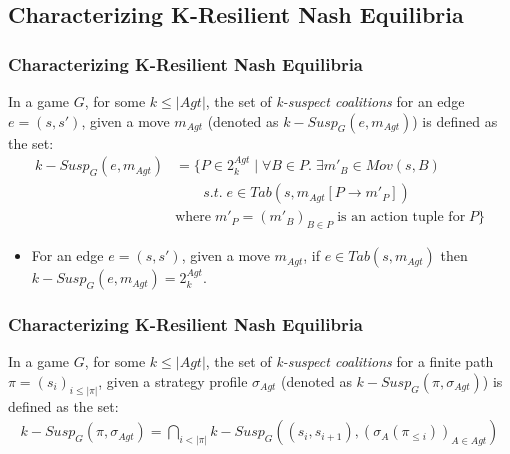 \documentclass{beamer}
\begin{document}
\subsection*{Characterizing K-Resilient Nash Equilibria}
\begin{frame}
\frametitle{Characterizing K-Resilient Nash Equilibria}
\begin{definition}
In a game $G$, for some $k \leq \vert Agt \vert$, the set of \textit{k-suspect coalitions} for an edge $e = (s, s')$, given a move $m_{Agt}$ (denoted as $k-Susp_{G}(e, m_{Agt})$) is defined as the set:
\begin{align*}
k-Susp_{G}(e, m_{Agt}) &= \lbrace P \in 2^{Agt}_{k} \; \vert \; \forall B \in P. \; \exists m'_{B} \in Mov(s, B) \\
&\qquad s.t. \; e \in Tab(s, m_{Agt}[P \rightarrow m'_{P}])\\
& \text{where} \; m'_{P} = (m'_{B})_{B\in P} \; \text{is an action tuple for} \; P\rbrace
\end{align*}
\end{definition}
\begin{itemize}
\item For an edge $e = (s, s')$, given a move $m_{Agt}$, if $e \in Tab(s, m_{Agt})$ then $k-Susp_{G}(e, m_{Agt}) = 2^{Agt}_{k}$.
\end{itemize}
\end{frame}

\begin{frame}
\frametitle{Characterizing K-Resilient Nash Equilibria}
\begin{definition}
In a game $G$, for some $k \leq \vert Agt \vert$, the set of \textit{k-suspect coalitions} for a finite path $\pi = (s_{i})_{i \leq \vert \pi \vert}$, given a strategy profile $\sigma_{Agt}$ (denoted as $k-Susp_{G}(\pi, \sigma_{Agt})$) is defined as the set:
\begin{align*}
k-Susp_{G}(\pi, \sigma_{Agt}) = \bigcap \limits_{i<\vert \pi \vert} k-Susp_{G}((s_{i}, s_{i+1}), (\sigma_{A}(\pi_{\leq i}))_{A\in Agt})
\end{align*}
\end{definition}
\end{frame}
\end{document}
